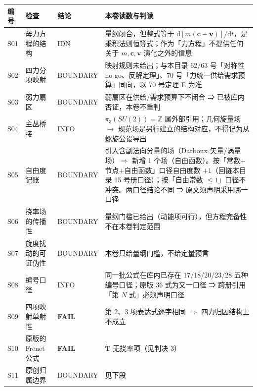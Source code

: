 \documentclass[UTF8,fontset=fandol,11pt]{ctexart}
\newcommand{\dd}{\mathrm{d}}
\newcommand{\bx}{\boldsymbol}
\begin{document}
\begin{center}
\begin{tabular}{p{1.3cm}p{4.4cm}p{1.6cm}p{8.0cm}}
\toprule
编号 & 检查 & 结论 & 本卷读数与判读 \\
\midrule
S01 & 母力方程的结构 & IDN & 量纲闭合，但整式等于 $\dd[m(\bx c-\bx v)]/\dd t$，是乘积法则恒等式；作为「力方程」不提供任何关于 $m,\bx c,\bx v$ 演化之外的信息 \\
S02 & 四力分项映射 & BOUNDARY & 映射规则未给出；与本目录 62/63 号「对称性 no-go、反解定理」、70 号「力统一供给需求预算」同向，以 70 号定理 E 为准 \\
S03 & 弱力扇区 & BOUNDARY & 弱扇区在供给/需求预算下不闭合 ⇒ 已被库内否证，本卷不重判 \\
S04 & 主丛桥接 & INFO & $\pi_3(SU(2))=\mathbb Z$ 属外部引用；几何旋量场 $\to$ 规范场是另行建立的结构对应，不得记为从螺旋公设导出 \\
S05 & 自由度记账 & BOUNDARY & 引入含副法向分量的场（Darboux 矢量/涡量场）$\Rightarrow$ 新增 1 个场（自由函数）。按「常数$+$节点$+$自由函数」口径自由度数 $+1$（回链本目录 15 号册口径）；按「自由常数 $\le1$」口径不冲突。两口径结论不同 ⇒ 原文须声明采用哪一口径 \\
S06 & 挠率场的传播性 & BOUNDARY & 量纲门槛已给出（动能项可行），但方程完备性不在本卷判定范围 \\
S07 & 旋度扰动的可证伪性 & BOUNDARY & 本卷只给量纲门槛，不给定量预言 \\
S08 & 编号口径 & INFO & 同一批公式在库内已存在 17/18/20/23/28 五种编号口径；原版 36 式为又一口径 ⇒ 跨册引用「第 $N$ 式」必须声明口径 \\
S09 & 四项映射单射性 & \textbf{FAIL} & 第 2、3 项表达式逐字相同 $\Rightarrow$ 四力归因结构上不成立 \\
S10 & 原版的 Frenet 公式 & \textbf{FAIL} & $\dot{\bx T}$ 无挠率项（见判决 3） \\
S11 & 原创归属边界 & BOUNDARY & 见下段 \\
\bottomrule
\end{tabular}
\end{center}
\end{document}

